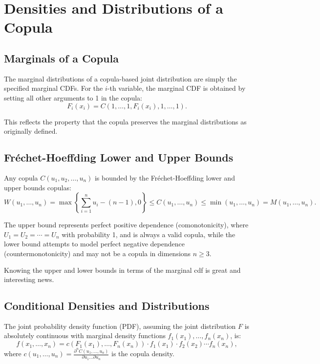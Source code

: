 \documentclass[
	11pt, %
	fleqn, %
	a4paper, %
]{LegrandOrangeBook}
\begin{document}
\section{Densities and Distributions of a Copula}
\subsection{Marginals of a Copula}
The marginal distributions of a copula-based joint distribution are simply the specified marginal CDFs. For the $i$-th variable, the marginal CDF is obtained by setting all other arguments to 1 in the copula:
\begin{equation}
F_i(x_i) = C(1,\ldots,1,F_i(x_i),1,\ldots,1).
\end{equation}

This reflects the property that the copula preserves the marginal distributions as originally defined.

\subsection{Fréchet-Hoeffding Lower and Upper Bounds}
Any copula $C(u_1,u_2,\ldots,u_n)$ is bounded by the Fréchet-Hoeffding lower and upper bounds copulas:
\begin{equation}
W(u_1,\ldots,u_n) = \max\left\{\sum_{i=1}^n u_i - (n-1), 0\right\} \leq C(u_1,\ldots,u_n) \leq \min(u_1,\ldots,u_n) = M(u_1,\ldots,u_n).
\label{eq:frechetbounds}
\end{equation}

The upper bound represents perfect positive dependence (comonotonicity), where $U_1 = U_2 = \cdots = U_n$ with probability 1, and is always a valid copula, while the lower bound attempts to model perfect negative dependence (countermonotonicity) and may not be a copula in dimensions $n \geq 3$.

Knowing the upper and lower bounds in terms of the marginal cdf is great and interesting news.

\subsection{Conditional Densities and Distributions}
The joint probability density function (PDF), assuming the joint distribution $F$ is absolutely continuous with marginal density functions $f_1(x_1),\ldots, f_n(x_n)$, is:
\begin{equation}
f(x_1,\ldots, x_n) = c(F_1(x_1),\ldots,F_n(x_n)) \cdot f_1(x_1) \cdot f_2(x_2) \cdots f_n(x_n),
\label{eq:jointdensity}
\end{equation}
where $c(u_1,\ldots,u_n) = \frac{\partial^n C(u_1,\ldots,u_n)}{\partial u_1 \ldots \partial u_n}$ is the copula density.
\end{document}
